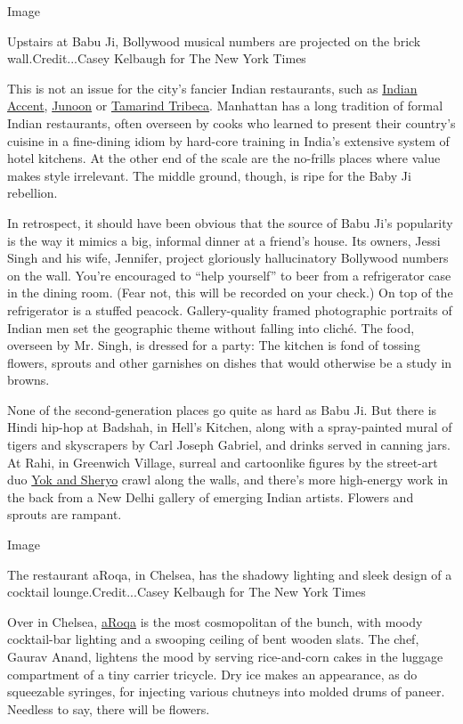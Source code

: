 Image

Upstairs at Babu Ji, Bollywood musical numbers are projected on the
brick wall.Credit...Casey Kelbaugh for The New York Times

This is not an issue for the city's fancier Indian restaurants, such as
\href{https://www.nytimes3xbfgragh.onion/2016/05/25/dining/indian-accent-restaurant-review.html}{Indian
Accent},
\href{https://www.nytimes3xbfgragh.onion/2011/03/30/dining/reviews/30rest.html}{Junoon}
or
\href{https://www.nytimes3xbfgragh.onion/2010/08/04/dining/reviews/04rest.html}{Tamarind
Tribeca}. Manhattan has a long tradition of formal Indian restaurants,
often overseen by cooks who learned to present their country's cuisine
in a fine-dining idiom by hard-core training in India's extensive system
of hotel kitchens. At the other end of the scale are the no-frills
places where value makes style irrelevant. The middle ground, though, is
ripe for the Baby Ji rebellion.

In retrospect, it should have been obvious that the source of Babu Ji's
popularity is the way it mimics a big, informal dinner at a friend's
house. Its owners, Jessi Singh and his wife, Jennifer, project
gloriously hallucinatory Bollywood numbers on the wall. You're
encouraged to ``help yourself'' to beer from a refrigerator case in the
dining room. (Fear not, this will be recorded on your check.) On top of
the refrigerator is a stuffed peacock. Gallery-quality framed
photographic portraits of Indian men set the geographic theme without
falling into cliché. The food, overseen by Mr. Singh, is dressed for a
party: The kitchen is fond of tossing flowers, sprouts and other
garnishes on dishes that would otherwise be a study in browns.

None of the second-generation places go quite as hard as Babu Ji. But
there is Hindi hip-hop at Badshah, in Hell's Kitchen, along with a
spray-painted mural of tigers and skyscrapers by Carl Joseph Gabriel,
and drinks served in canning jars. At Rahi, in Greenwich Village,
surreal and cartoonlike figures by the street-art duo
\href{http://www.yokandsheryo.com/}{Yok and Sheryo} crawl along the
walls, and there's more high-energy work in the back from a New Delhi
gallery of emerging Indian artists. Flowers and sprouts are rampant.

Image

The restaurant aRoqa, in Chelsea, has the shadowy lighting and sleek
design of a cocktail lounge.Credit...Casey Kelbaugh for The New York
Times

Over in Chelsea, \href{https://www.aroqanyc.com/}{aRoqa} is the most
cosmopolitan of the bunch, with moody cocktail-bar lighting and a
swooping ceiling of bent wooden slats. The chef, Gaurav Anand, lightens
the mood by serving rice-and-corn cakes in the luggage compartment of a
tiny carrier tricycle. Dry ice makes an appearance, as do squeezable
syringes, for injecting various chutneys into molded drums of paneer.
Needless to say, there will be flowers.

